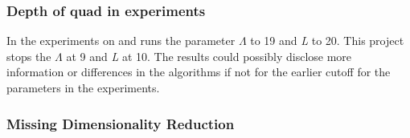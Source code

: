 \subsubsection{Depth of quad in experiments}
In \cite{wagner17} the experiments on \qs{} and \grid{} runs the parameter $\Lambda$ to 19 and \textit{L} to 20. This project stops the $\Lambda$ at 9 and \textit{L} at 10. The results could possibly disclose more information or differences in the algorithms if not for the earlier cutoff for the parameters in the experiments.

\subsubsection{Missing Dimensionality Reduction}